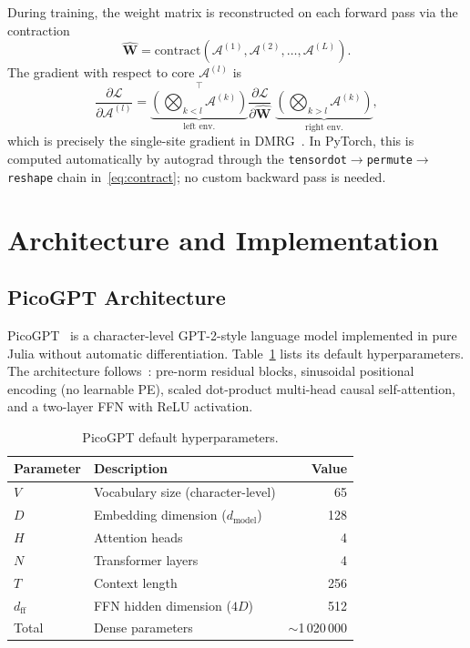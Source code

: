 \documentclass[11pt,a4paper]{article}
\newcommand{\mpomat}[1]{\mathbf{#1}}
\newcommand{\calA}{\mathcal{A}}
\theoremstyle{definition}
\begin{document}
During training, the weight matrix is reconstructed on each forward pass via the contraction
\begin{equation}
  \widehat{\mpomat{W}} = \text{contract}\!\left(\calA^{(1)}, \calA^{(2)}, \ldots, \calA^{(L)}\right).
  \label{eq:contract}
\end{equation}
The gradient with respect to core $\calA^{(l)}$ is
\begin{equation}
  \frac{\partial \mathcal{L}}{\partial \calA^{(l)}}
  = \underbrace{\left(\bigotimes_{k < l} \calA^{(k)}\right)}_{\text{left env.}}^\top
    \frac{\partial \mathcal{L}}{\partial \widehat{\mpomat{W}}}\;
    \underbrace{\left(\bigotimes_{k > l} \calA^{(k)}\right)}_{\text{right env.}},
  \label{eq:gradient}
\end{equation}
which is precisely the single-site gradient in DMRG~\citep{white1992density}. In PyTorch, this is computed automatically by autograd through the \texttt{tensordot}$\to$\texttt{permute}$\to$\texttt{reshape} chain in~\eqref{eq:contract}; no custom backward pass is needed.


\section{Architecture and Implementation}

\subsection{PicoGPT Architecture}

PicoGPT~\citep{osborne2024picogpt} is a character-level GPT-2-style language model implemented in pure Julia without automatic differentiation. Table~\ref{tab:arch} lists its default hyperparameters. The architecture follows~\citet{radford2019language}: pre-norm residual blocks, sinusoidal positional encoding (no learnable PE), scaled dot-product multi-head causal self-attention, and a two-layer FFN with ReLU activation.

\begin{table}[H]
\centering
\caption{PicoGPT default hyperparameters.}
\label{tab:arch}
\begin{tabular}{llr}
\toprule
Parameter & Description & Value \\
\midrule
$V$        & Vocabulary size (character-level) & 65 \\
$D$        & Embedding dimension ($d_\text{model}$) & 128 \\
$H$        & Attention heads & 4 \\
$N$        & Transformer layers & 4 \\
$T$        & Context length & 256 \\
$d_\text{ff}$ & FFN hidden dimension ($4D$) & 512 \\
\midrule
Total & Dense parameters & ${\sim}$1\,020\,000 \\
\bottomrule
\end{tabular}
\end{table}
\end{document}
